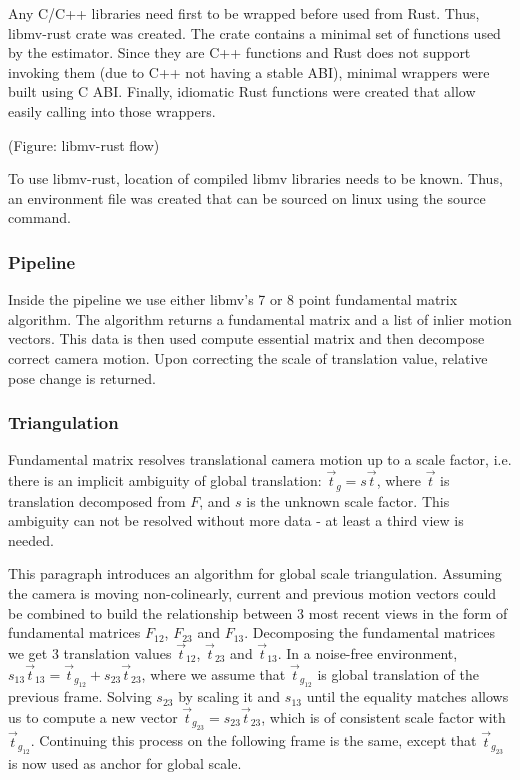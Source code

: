 \documentclass[11pt,english]{report}
\begin{document}
Any C/C++ libraries need first to be wrapped before used from Rust. Thus, libmv-rust crate was created. The crate contains a minimal set of functions used by the estimator. Since they are C++ functions and Rust does not support invoking them (due to C++ not having a stable ABI), minimal wrappers were built using C ABI. Finally, idiomatic Rust functions were created that allow easily calling into those wrappers.

(Figure: libmv-rust flow)

To use libmv-rust, location of compiled libmv libraries needs to be known. Thus, an environment file was created that can be sourced on linux using the source command.

\subsubsection{Pipeline}

Inside the pipeline we use either libmv's 7 or 8 point fundamental matrix algorithm. The algorithm returns a fundamental matrix and a list of inlier motion vectors. This data is then used compute essential matrix and then decompose correct camera motion. Upon correcting the scale of translation value, relative pose change is returned.

\subsubsection{Triangulation}

Fundamental matrix resolves translational camera motion up to a scale factor, i.e. there is an implicit ambiguity\cite{hartley_zisserman_2004} of global translation: $\overrightarrow{t}_g = s\overrightarrow{t}$, where $\overrightarrow{t}$ is translation decomposed from $F$, and $s$ is the unknown scale factor. This ambiguity can not be resolved without more data - at least a third view is needed.

This paragraph introduces an algorithm for global scale triangulation. Assuming the camera is moving non-colinearly, current and previous motion vectors could be combined to build the relationship between 3 most recent views in the form of fundamental matrices $F_{12}$, $F_{23}$ and $F_{13}$. Decomposing the fundamental matrices we get 3 translation values $\overrightarrow{t}_{12}$, $\overrightarrow{t}_{23}$ and $\overrightarrow{t}_{13}$. In a noise-free environment, $s_{13}\overrightarrow{t}_{13} = \overrightarrow{t}_{g_{12}} + s_{23}\overrightarrow{t}_{23}$, where we assume that $\overrightarrow{t}_{g_{12}}$ is global translation of the previous frame. Solving $s_{23}$ by scaling it and $s_{13}$ until the equality matches allows us to compute a new vector $\overrightarrow{t}_{g_{23}} = s_{23}\overrightarrow{t}_{23}$, which is of consistent scale factor with $\overrightarrow{t}_{g_{12}}$. Continuing this process on the following frame is the same, except that $\overrightarrow{t}_{g_{23}}$ is now used as anchor for global scale.
\end{document}
